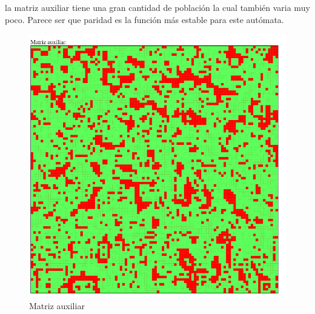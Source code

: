 	la matriz auxiliar tiene una gran cantidad de población la cual también varia muy poco. Parece ser que paridad es la función más estable para este autómata.
	\begin{figure}[H]
		\begin{center}
			\includegraphics[scale=.3]{GOLM/img/regla3318-3-1.png}
			\caption{Matriz auxiliar}
			\label{fig:golm28}
		\end{center}
	\end{figure}



